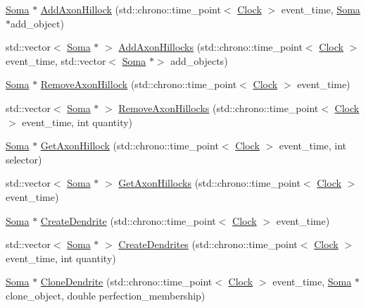 \begin{DoxyCompactItemize}
\item 
\hyperlink{class_soma}{Soma} $\ast$ \hyperlink{class_soma_a02e0e4656099531b35ab56ad1f7c945a}{Add\+Axon\+Hillock} (std\+::chrono\+::time\+\_\+point$<$ \hyperlink{universe_8h_a0ef8d951d1ca5ab3cfaf7ab4c7a6fd80}{Clock} $>$ event\+\_\+time, \hyperlink{class_soma}{Soma} $\ast$add\+\_\+object)
\item 
std\+::vector$<$ \hyperlink{class_soma}{Soma} $\ast$ $>$ \hyperlink{class_soma_a0fbede6e06b8e24a2cf22878c2f49165}{Add\+Axon\+Hillocks} (std\+::chrono\+::time\+\_\+point$<$ \hyperlink{universe_8h_a0ef8d951d1ca5ab3cfaf7ab4c7a6fd80}{Clock} $>$ event\+\_\+time, std\+::vector$<$ \hyperlink{class_soma}{Soma} $\ast$$>$ add\+\_\+objects)
\item 
\hyperlink{class_soma}{Soma} $\ast$ \hyperlink{class_soma_a2f75c0f716fa1f74f70697db9dfcd562}{Remove\+Axon\+Hillock} (std\+::chrono\+::time\+\_\+point$<$ \hyperlink{universe_8h_a0ef8d951d1ca5ab3cfaf7ab4c7a6fd80}{Clock} $>$ event\+\_\+time)
\item 
std\+::vector$<$ \hyperlink{class_soma}{Soma} $\ast$ $>$ \hyperlink{class_soma_a7281585d74015a2549a19df6cb16e3fb}{Remove\+Axon\+Hillocks} (std\+::chrono\+::time\+\_\+point$<$ \hyperlink{universe_8h_a0ef8d951d1ca5ab3cfaf7ab4c7a6fd80}{Clock} $>$ event\+\_\+time, int quantity)
\item 
\hyperlink{class_soma}{Soma} $\ast$ \hyperlink{class_soma_ac8756f68dbaac8c70cfba435f7068a85}{Get\+Axon\+Hillock} (std\+::chrono\+::time\+\_\+point$<$ \hyperlink{universe_8h_a0ef8d951d1ca5ab3cfaf7ab4c7a6fd80}{Clock} $>$ event\+\_\+time, int selector)
\item 
std\+::vector$<$ \hyperlink{class_soma}{Soma} $\ast$ $>$ \hyperlink{class_soma_af76f86d082c3f60442148ec843b586e7}{Get\+Axon\+Hillocks} (std\+::chrono\+::time\+\_\+point$<$ \hyperlink{universe_8h_a0ef8d951d1ca5ab3cfaf7ab4c7a6fd80}{Clock} $>$ event\+\_\+time)
\item 
\hyperlink{class_soma}{Soma} $\ast$ \hyperlink{class_soma_a0fab0c7cf54c2b7d36e90edcd3e21a16}{Create\+Dendrite} (std\+::chrono\+::time\+\_\+point$<$ \hyperlink{universe_8h_a0ef8d951d1ca5ab3cfaf7ab4c7a6fd80}{Clock} $>$ event\+\_\+time)
\item 
std\+::vector$<$ \hyperlink{class_soma}{Soma} $\ast$ $>$ \hyperlink{class_soma_a68dc02eff2912ad045900ab1879f020e}{Create\+Dendrites} (std\+::chrono\+::time\+\_\+point$<$ \hyperlink{universe_8h_a0ef8d951d1ca5ab3cfaf7ab4c7a6fd80}{Clock} $>$ event\+\_\+time, int quantity)
\item 
\hyperlink{class_soma}{Soma} $\ast$ \hyperlink{class_soma_ad51c97b76dd7a1f77dc987ae33fd89bc}{Clone\+Dendrite} (std\+::chrono\+::time\+\_\+point$<$ \hyperlink{universe_8h_a0ef8d951d1ca5ab3cfaf7ab4c7a6fd80}{Clock} $>$ event\+\_\+time, \hyperlink{class_soma}{Soma} $\ast$clone\+\_\+object, double perfection\+\_\+membership)
$$
\end{DoxyCompactItemize}
